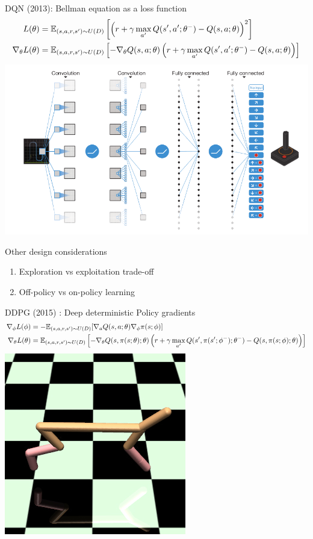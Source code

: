 \documentclass[notes]{beamer} %
\newcommand{\grad}{\nabla}
\begin{document}
\begin{frame}{DQN (2013): Bellman equation as a loss function}
  \tiny
  \begin{align*}
    L(\theta) &= \bbE_{(s,a,r,s') \sim U(D)} \left[\left(
    r + \gamma \max_{a'} Q(s', a'; \theta^-) - Q(s, a; \theta)\right)^2\right]
    \\
    \grad_\theta L(\theta) & = \bbE_{(s,a,r,s') \sim U(D)} \left[
    -\grad_\theta Q(s, a; \theta) \left(r + \gamma \max_{a'} Q(s', a'; \theta^-) - Q(s, a; \theta)\right)\right]
  \end{align*}
  \includegraphics[width=0.7\linewidth]{./media/DQN-arch.png}
\end{frame}

\begin{frame}{Other design considerations}
  \begin{enumerate}
  \item Exploration vs exploitation trade-off
  \item Off-policy vs on-policy learning
  \end{enumerate}
\end{frame}

\begin{frame}{DDPG (2015) : Deep deterministic Policy gradients}
  \tiny
  \begin{align*}
    \grad_\phi L(\phi) &= -\bbE_{(s, a, r, s') \sim U(D)}[\grad_a Q(s, a; \theta)\grad_\phi \pi(s; \phi)]
    \\
    \grad_\theta L(\theta) & = \bbE_{(s,a,r,s') \sim U(D)} \left[
                             -\grad_\theta Q(s, \pi(s; \theta); \theta) \left(r + \gamma \max_{a'} Q(s', \pi(s'; \phi^-); \theta^-) - Q(s, \pi(s; \phi); \theta)\right)\right]
  \end{align*}
  \includegraphics[width=0.3\linewidth]{./media/cheetah.png}
\end{frame}
\end{document}
